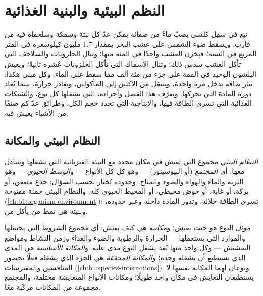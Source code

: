 \chapter{النظم البيئية والبنية الغذائية}\label{ch:b1:ecosystem-organization}

نبع في سهل كلسي يصبّ ماءً من صفائه يمكن عدّ كل نبتة وسمكة وسلحفاة
فيه من قارب. ويسقط ضوء الشمس على عشب البحر بمقدار \qty{1.7}{} مليون
كيلوسعرة في المتر المربع في السنة؛ فيخزن العشب واحدًا في المئة منها؛
وتنال الحلزونات والسلاحف التي تأكل العشب سدس ذلك؛ وتنال الأسماك
التي تأكل الحلزونات عُشره ثانيةً؛ ويعيش البلشون الوحيد في القمة على
جزء من مئة ألف مما سقط على الماء. وكل  مبني هكذا: تيار
طاقة يدخل مرة واحدة، وينتقل من الآكلين إلى المأكولين، ويغادر
حرارة، بينما تُعاد دورة المادة التي يحركها. ويعرّف هذا الفصل  وأجزاءه،  التي يشغلها كل نوع، 
والشبكات الغذائية التي تسري الطاقة فيها، والإنتاجية التي تحدد حجم
الكل، وطرائق عدّ كم صنفًا من الأشياء يعيش فيه.

\section{النظام البيئي والمكانة}

\begin{definition}\label{def:b1:ecosystem-organization:ecosystem}
\emph{النظام البيئي} مجموع  التي تعيش في مكان محدد مع
البيئة الفيزيائية التي تشغلها وتتبادل معها: أي \emph{المجتمع}
(أو البيوسينوز) --- وهو كل  كل الأنواع --- و\emph{الوسط
الحيوي} --- وهو التربة والماء والهواء والضوء والمناخ. وحدوده
تُختار بحسب السؤال: جذع متعفن، أو بركة، أو غابة، أو حوض محيطي، أو
المحيط الحيوي كله. والنظام البيئي جملة مفتوحة
(\cref{ch:b1:organism-environment}): تسري الطاقة خلاله، وتدور
المادة داخله وعبر حدوده، وبنيته هي نمط من يأكل من.
\end{definition}

\begin{definition}\label{def:b1:ecosystem-organization:niche}
\emph{موئل} النوع هو حيث يعيش؛ و\emph{مكانته} هي كيف يعيش: أي
مجموع الشروط التي يحتملها والموارد التي يستعملها ---
الحرارة والرطوبة والضوء والغذاء وزمن النشاط ومواضع التعشيش ---
وكل واحد منها بُعد يشغل النوع مدى عليه. و\emph{المكانة الأساسية}
هي المدى الذي يستطيع أن يشغله وحده؛ و\emph{المكانة المحققة} هي
الجزء الذي يشغله فعلًا بحضور المنافسين والمفترسات
(\cref{ch:b1:species-interactions}).
ونوعان لهما المكانة نفسها لا يستطيعان التعايش في مكان واحد طويلًا؛
ومكانات الأنواع المتعايشة مختلفة، والمجتمع مجموعة من المكانات
مركّبة معًا.
\end{definition}

